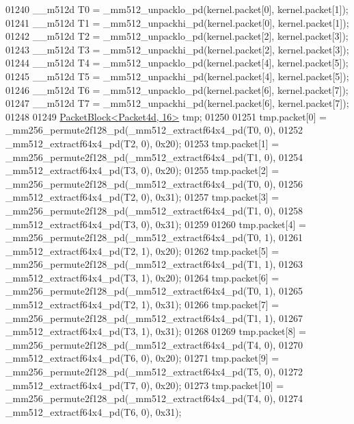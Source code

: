 \begin{DoxyCode}
01240   \_\_m512d T0 = \_mm512\_unpacklo\_pd(kernel.packet[0], kernel.packet[1]);
01241   \_\_m512d T1 = \_mm512\_unpackhi\_pd(kernel.packet[0], kernel.packet[1]);
01242   \_\_m512d T2 = \_mm512\_unpacklo\_pd(kernel.packet[2], kernel.packet[3]);
01243   \_\_m512d T3 = \_mm512\_unpackhi\_pd(kernel.packet[2], kernel.packet[3]);
01244   \_\_m512d T4 = \_mm512\_unpacklo\_pd(kernel.packet[4], kernel.packet[5]);
01245   \_\_m512d T5 = \_mm512\_unpackhi\_pd(kernel.packet[4], kernel.packet[5]);
01246   \_\_m512d T6 = \_mm512\_unpacklo\_pd(kernel.packet[6], kernel.packet[7]);
01247   \_\_m512d T7 = \_mm512\_unpackhi\_pd(kernel.packet[6], kernel.packet[7]);
01248 
01249   \hyperlink{struct_eigen_1_1internal_1_1_packet_block}{PacketBlock<Packet4d, 16>} tmp;
01250 
01251   tmp.packet[0] = \_mm256\_permute2f128\_pd(\_mm512\_extractf64x4\_pd(T0, 0),
01252                                          \_mm512\_extractf64x4\_pd(T2, 0), 0x20);
01253   tmp.packet[1] = \_mm256\_permute2f128\_pd(\_mm512\_extractf64x4\_pd(T1, 0),
01254                                          \_mm512\_extractf64x4\_pd(T3, 0), 0x20);
01255   tmp.packet[2] = \_mm256\_permute2f128\_pd(\_mm512\_extractf64x4\_pd(T0, 0),
01256                                          \_mm512\_extractf64x4\_pd(T2, 0), 0x31);
01257   tmp.packet[3] = \_mm256\_permute2f128\_pd(\_mm512\_extractf64x4\_pd(T1, 0),
01258                                          \_mm512\_extractf64x4\_pd(T3, 0), 0x31);
01259 
01260   tmp.packet[4] = \_mm256\_permute2f128\_pd(\_mm512\_extractf64x4\_pd(T0, 1),
01261                                          \_mm512\_extractf64x4\_pd(T2, 1), 0x20);
01262   tmp.packet[5] = \_mm256\_permute2f128\_pd(\_mm512\_extractf64x4\_pd(T1, 1),
01263                                          \_mm512\_extractf64x4\_pd(T3, 1), 0x20);
01264   tmp.packet[6] = \_mm256\_permute2f128\_pd(\_mm512\_extractf64x4\_pd(T0, 1),
01265                                          \_mm512\_extractf64x4\_pd(T2, 1), 0x31);
01266   tmp.packet[7] = \_mm256\_permute2f128\_pd(\_mm512\_extractf64x4\_pd(T1, 1),
01267                                          \_mm512\_extractf64x4\_pd(T3, 1), 0x31);
01268 
01269   tmp.packet[8] = \_mm256\_permute2f128\_pd(\_mm512\_extractf64x4\_pd(T4, 0),
01270                                          \_mm512\_extractf64x4\_pd(T6, 0), 0x20);
01271   tmp.packet[9] = \_mm256\_permute2f128\_pd(\_mm512\_extractf64x4\_pd(T5, 0),
01272                                          \_mm512\_extractf64x4\_pd(T7, 0), 0x20);
01273   tmp.packet[10] = \_mm256\_permute2f128\_pd(\_mm512\_extractf64x4\_pd(T4, 0),
01274                                           \_mm512\_extractf64x4\_pd(T6, 0), 0x31);

\end{DoxyCode}
